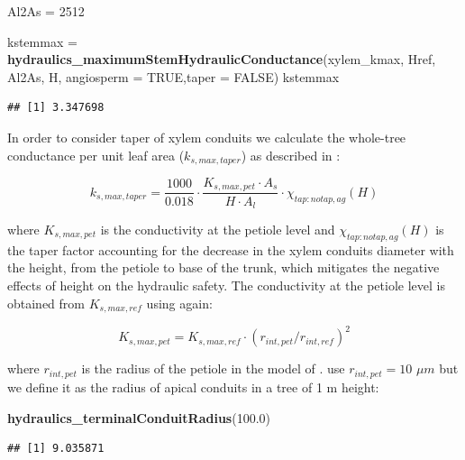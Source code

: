 \documentclass[]{book}
\newenvironment{Shaded}{\begin{snugshade}}{\end{snugshade}}
\newcommand{\KeywordTok}[1]{\textcolor[rgb]{0.13,0.29,0.53}{\textbf{#1}}}
\newcommand{\DataTypeTok}[1]{\textcolor[rgb]{0.13,0.29,0.53}{#1}}
\newcommand{\DecValTok}[1]{\textcolor[rgb]{0.00,0.00,0.81}{#1}}
\newcommand{\FloatTok}[1]{\textcolor[rgb]{0.00,0.00,0.81}{#1}}
\newcommand{\StringTok}[1]{\textcolor[rgb]{0.31,0.60,0.02}{#1}}
\newcommand{\OtherTok}[1]{\textcolor[rgb]{0.56,0.35,0.01}{#1}}
\newcommand{\NormalTok}[1]{#1}
\begin{document}
\begin{Shaded}
\begin{Highlighting}[]
\NormalTok{Al2As =}\StringTok{ }\DecValTok{2512} 

\NormalTok{kstemmax =}\StringTok{ }\KeywordTok{hydraulics_maximumStemHydraulicConductance}\NormalTok{(xylem_kmax, }
\NormalTok{                  Href, Al2As, H, }\DataTypeTok{angiosperm =} \OtherTok{TRUE}\NormalTok{,}\DataTypeTok{taper =} \OtherTok{FALSE}\NormalTok{)}
\NormalTok{kstemmax}
\end{Highlighting}
\end{Shaded}

\begin{verbatim}
## [1] 3.347698
\end{verbatim}

In order to consider taper of xylem conduits we calculate the whole-tree
conductance per unit leaf area (\(k_{s, max, taper}\)) as described in
\citet{Christoffersen2016}:

\begin{equation}
k_{s, max, taper}=\frac{1000}{0.018} \cdot \frac{K_{s,max,pet}\cdot A_{s}}{H\cdot A_{l}}\cdot \chi_{tap:notap,ag}(H)
\end{equation}

where \(K_{s,max,pet}\) is the conductivity at the petiole level and
\(\chi_{tap:notap,ag}(H)\) is the taper factor accounting for the
decrease in the xylem conduits diameter with the height, from the
petiole to base of the trunk, which mitigates the negative effects of
height on the hydraulic safety. The conductivity at the petiole level is
obtained from \(K_{s,max,ref}\) using again:

\begin{equation}
K_{s,max,pet} = K_{s,max,ref}\cdot (r_{int, pet}/r_{int,ref})^{2}
\end{equation}

where \(r_{int, pet}\) is the radius of the petiole in the model of
\citet{Savage2010}. \citet{Christoffersen2016} use \(r_{int, pet} = 10\)
\(\mu m\) but we define it as the radius of apical conduits in a tree of
1 m height:

\begin{Shaded}
\begin{Highlighting}[]
\KeywordTok{hydraulics_terminalConduitRadius}\NormalTok{(}\FloatTok{100.0}\NormalTok{)}
\end{Highlighting}
\end{Shaded}

\begin{verbatim}
## [1] 9.035871
\end{verbatim}
\end{document}

